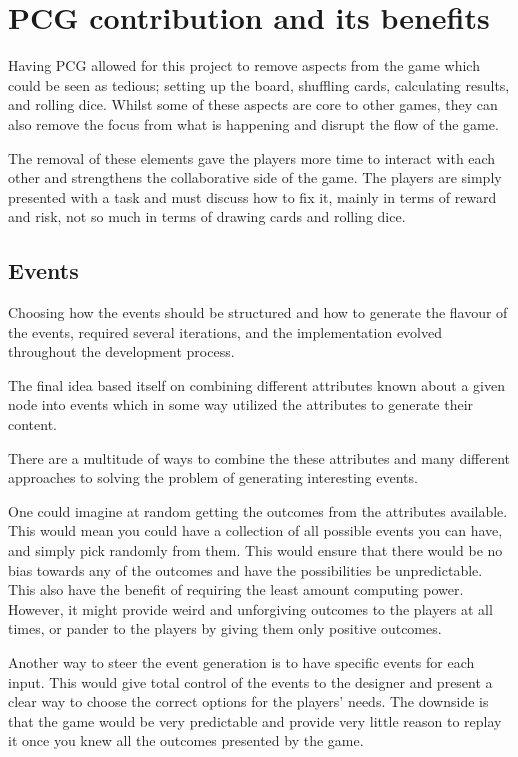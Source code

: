 \section{PCG contribution and its benefits}
\label{sec:pcgben}
Having PCG allowed for this project to remove aspects from the game which could be seen as tedious; setting up the board, shuffling cards, calculating results, and rolling dice. Whilst some of these aspects are core to other games, they can also remove the focus from what is happening and disrupt the flow of the game.

The removal of these elements gave the players more time to interact with each other and strengthens the collaborative side of the game. The players are simply presented with a task and must discuss how to fix it, mainly in terms of reward and risk, not so much in terms of drawing cards and rolling dice.






\subsection{Events}
Choosing how the events should be structured and how to generate the flavour of the events, required several iterations, and the implementation evolved throughout the development process.

The final idea based itself on combining different attributes known about a given node into events which in some way utilized the attributes to generate their content. 

There are a multitude of ways to combine the these attributes and many different approaches to solving the problem of generating interesting events.

One could imagine at random getting the outcomes from the attributes available. 
This would mean you could have a collection of all possible events you can have, and simply pick randomly from them. 
This would ensure that there would be no bias towards any of the outcomes and have the possibilities be unpredictable. This also have the benefit of requiring the least amount computing power. 
However, it might provide weird and unforgiving outcomes to the players at all times, or pander to the players by giving them only positive outcomes.

Another way to steer the event generation is to have specific events for each input. This would give total control of the events to the designer and present a clear way to choose the correct options for the players' needs.
The downside is that the game would be very predictable and provide very little reason to replay it once you knew all the outcomes presented by the game.

